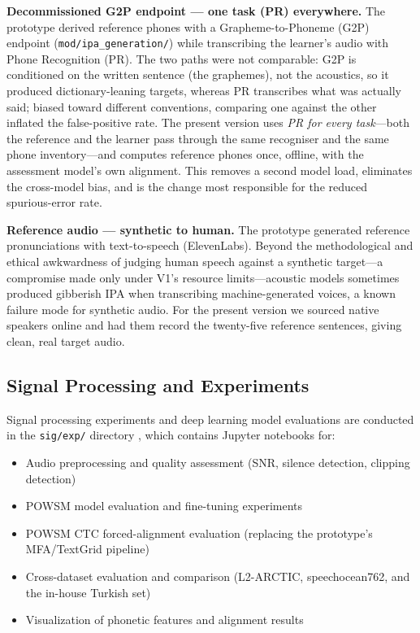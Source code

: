 \documentclass[a4paper,12pt]{report}
\begin{document}
\textbf{Decommissioned G2P endpoint --- one task (PR) everywhere.} The prototype derived reference phones with a Grapheme-to-Phoneme (G2P) endpoint (\texttt{mod/ipa\_generation/}) while transcribing the learner's audio with Phone Recognition (PR). The two paths were not comparable: G2P is conditioned on the written sentence (the graphemes), not the acoustics, so it produced dictionary-leaning targets, whereas PR transcribes what was actually said; biased toward different conventions, comparing one against the other inflated the false-positive rate. The present version uses \emph{PR for every task}---both the reference and the learner pass through the same recogniser and the same phone inventory---and computes reference phones once, offline, with the assessment model's own alignment. This removes a second model load, eliminates the cross-model bias, and is the change most responsible for the reduced spurious-error rate.

\textbf{Reference audio --- synthetic to human.} The prototype generated reference pronunciations with text-to-speech (ElevenLabs). Beyond the methodological and ethical awkwardness of judging human speech against a synthetic target---a compromise made only under V1's resource limits---acoustic models sometimes produced gibberish IPA when transcribing machine-generated voices, a known failure mode for synthetic audio. For the present version we sourced native speakers online and had them record the twenty-five reference sentences, giving clean, real target audio.

\subsection{Signal Processing and Experiments}

Signal processing experiments and deep learning model evaluations are conducted in the \texttt{sig/exp/} directory \cite{github2024sig}, which contains Jupyter notebooks for:
\begin{itemize}
    \item Audio preprocessing and quality assessment (SNR, silence detection, clipping detection)
    \item POWSM \cite{powsm} model evaluation and fine-tuning experiments
    \item POWSM CTC forced-alignment evaluation (replacing the prototype's MFA/TextGrid pipeline)
    \item Cross-dataset evaluation and comparison (L2-ARCTIC, speechocean762, and the in-house Turkish set)
    \item Visualization of phonetic features and alignment results
\end{itemize}
\end{document}
